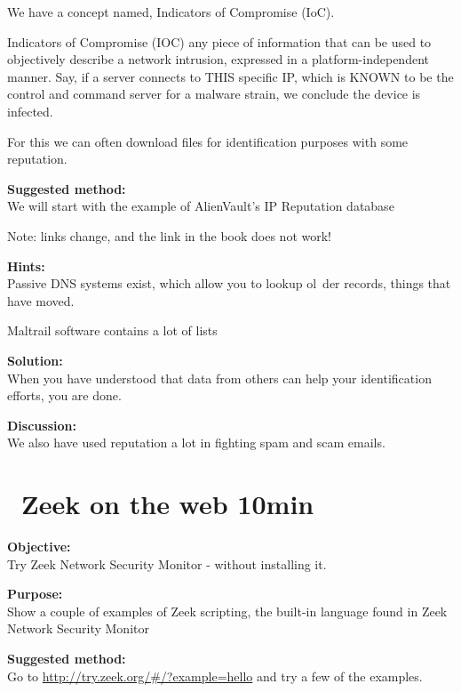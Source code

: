\documentclass[a4paper,11pt,notitlepage]{report}
\begin{document}
We have a concept named, Indicators of Compromise (IoC).

Indicators of Compromise (IOC) any piece of information that can be used to objectively describe a network intrusion, expressed in a platform-independent manner. Say, if a server connects to THIS specific IP, which is KNOWN to be the control and command server for a malware strain, we conclude the device is infected.

For this we can often download files for identification purposes with some reputation.

{\bf Suggested method:}\\
We will start with the example of
AlienVault’s IP Reputation database

Note: links change, and the link in the book does not work!




{\bf Hints:}\\
Passive DNS systems exist, which allow you to lookup ol\faExclamationTriangle\ der records, things that have moved.

Maltrail software contains a lot of lists\\

{\bf Solution:}\\
When you have understood that data from others can help your identification efforts, you are done.

{\bf Discussion:}\\
We also have used reputation a lot in fighting spam and scam emails.



\chapter{\faExclamationTriangle\ Zeek on the web 10min}
\label{ex:zeekweb}


{\bf Objective:} \\
Try Zeek Network Security Monitor - without installing it.


{\bf Purpose:}\\
Show a couple of examples of Zeek scripting, the built-in language found in Zeek Network Security Monitor


{\bf Suggested method:}\\
Go to \url{http://try.zeek.org/#/?example=hello} and try a few of the examples.
\end{document}
